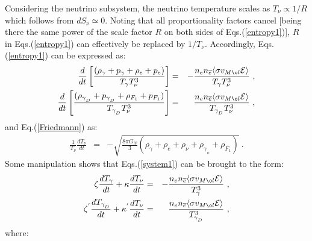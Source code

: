 \documentclass[12pt]{article}
\begin{document}
Considering the neutrino subsystem, the neutrino temperature scales as $T _{\nu} \propto 1/R$ which follows from $dS _{\nu} \simeq 0$. Noting that all proportionality factors cancel [being there the same power of the scale factor $R$ on both sides of Eqs.(\ref{entropy1})], $R$ in Eqs.(\ref{entropy1}) can effectively be replaced by $1/T _{\nu}$. Accordingly, Eqs.(\ref{entropy1}) can be expressed as:
%
\begin{eqnarray}
\frac{d}{dt} \left [ \frac{(\rho _{\gamma} + p _{\gamma} + \rho _e + p _e)}{T _{\gamma} T _{\nu} ^3}\right ] &=& - \frac{n _e n _{\overline{e}} \langle \sigma v_{M\o l} {\cal E} \rangle }{T _{\gamma} T _{\nu} ^3} \ , \nonumber \\
\frac{d}{dt} \left [ \frac{(\rho _{\gamma _{_D}} + p _{\gamma _{_D}} + \rho _{F_1} + p _{F_1})}{T _{\gamma _{_D}}T _{\nu} ^3}\right ] &=& \frac{n _e n _{\overline{e}} \langle \sigma v_{M\o l} {\cal E} \rangle }{T _{\gamma _{_D}}T _{\nu} ^3} \ ,
\label{system1}
\end{eqnarray}
%
and Eq.(\ref{Friedmann}) as:
%
\begin{eqnarray}
\frac{1}{T _{\nu}} \frac{dT _{\nu}}{dt} &=& - \sqrt{\frac{8\pi G_N}{3} \left ( \rho _{\gamma} + \rho _e + \rho _{\nu} + \rho _{\gamma _{_D}} + \rho _{F_1} \right )} \ .
\label{friedmannbis}
\end{eqnarray}
%
Some manipulation shows that Eqs.(\ref{system1}) can be brought to the form:
%
\begin{eqnarray}
\zeta \frac{dT _{\gamma}}{dt} + \kappa \frac{dT _{\nu}}{dt} &=& - \frac{n _{e} n _{\overline{e}} \langle \sigma v _{M\o l} {\cal E} \rangle }{T _{\gamma} ^3} \ , \nonumber \\
\zeta ^{'} \frac{dT _{\gamma _{_D}}}{dt} + \kappa ^{'} \frac{dT _{\nu}}{dt} &=& \frac{n _{e} n _{\overline{e}} \langle \sigma v _{M\o l} {\cal E} \rangle }{T _{\gamma _{_D}} ^3} \ ,
\label{sistema1}
\end{eqnarray}
%
where:
%
\end{document}
